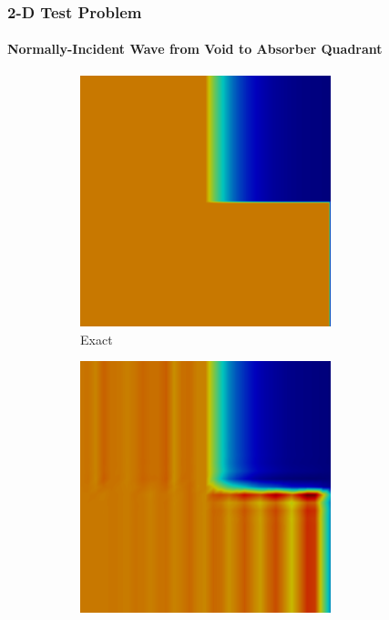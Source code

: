 \documentclass{beamer} \useoutertheme{infolines}
\begin{document}
\begin{frame}
\frametitle{2-D Test Problem}
\framesubtitle{Normally-Incident Wave from Void to Absorber Quadrant}

\begin{figure}[h]
   \centering
   \begin{subfigure}{0.3\textwidth}
      \includegraphics[width=0.8\textwidth]{./figures/exact.png}
      \caption{Exact}
   \end{subfigure}
   \begin{subfigure}{0.3\textwidth}
      \includegraphics[width=0.8\textwidth]{./figures/Gal.png}

\end{subfigure}
\end{figure}
\end{frame}
\end{document}
